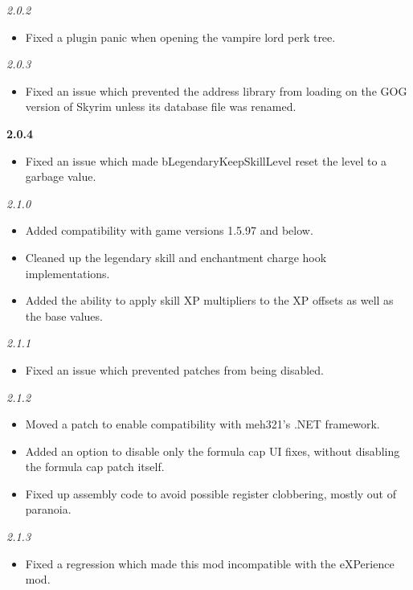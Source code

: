 \documentclass[12pt]{amsart}
\begin{document}
\startblock
\emph{2.0.2}
\begin{itemize}
    \item Fixed a plugin panic when opening the vampire lord perk tree.
\end{itemize}
\stopblock

\startblock
\emph{2.0.3}
\begin{itemize}
    \item Fixed an issue which prevented the address library from loading on
          the GOG version of Skyrim unless its database file was renamed.
\end{itemize}
\stopblock

\startblock
\textbf{2.0.4}
\begin{itemize}
    \item Fixed an issue which made bLegendaryKeepSkillLevel reset the level
          to a garbage value.
\end{itemize}
\stopblock

\startblock
\emph{2.1.0}
\begin{itemize}
    \item Added compatibility with game versions 1.5.97 and below.
    \item Cleaned up the legendary skill and enchantment charge hook
          implementations.
    \item Added the ability to apply skill XP multipliers to the XP offsets
          as well as the base values.
\end{itemize}
\stopblock

\startblock
\emph{2.1.1}
\begin{itemize}
    \item Fixed an issue which prevented patches from being disabled.
\end{itemize}
\stopblock

\startblock
\emph{2.1.2}
\begin{itemize}
    \item Moved a patch to enable compatibility with meh321's .NET framework.
    \item Added an option to disable only the formula cap UI fixes, without
          disabling the formula cap patch itself.
    \item Fixed up assembly code to avoid possible register clobbering, mostly
          out of paranoia.
\end{itemize}
\stopblock

\startblock
\emph{2.1.3}
\begin{itemize}
    \item Fixed a regression which made this mod incompatible with the
          eXPerience mod.
\end{itemize}
\stopblock
\end{document}
